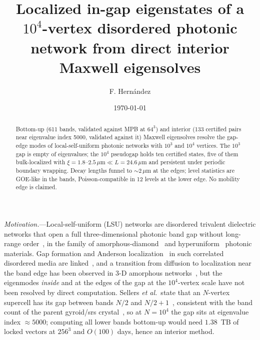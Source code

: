\documentclass[prl,twocolumn,superscriptaddress,showpacs]{revtex4-2}
\newcommand{\um}{\,\mu\mathrm{m}}
\begin{document}
\title{Localized in-gap eigenstates of a $10^4$-vertex disordered photonic network from direct interior Maxwell eigensolves}

\author{F. Hern\'andez}

\date{\today}

\begin{abstract}
Bottom-up (611 bands, validated against MPB at $64^3$) and interior (133 certified pairs near eigenvalue index 5000, validated against it) Maxwell eigensolves resolve the gap-edge modes of local-self-uniform photonic networks with $10^3$ and $10^4$ vertices. The $10^3$ gap is empty of eigenvalues; the $10^4$ pseudogap holds ten certified states, five of them bulk-localized with $\xi=1.8$--$2.5\um\ll L=24.6\um$ and persistent under periodic boundary wrapping. Decay lengths funnel to $\sim2\um$ at the edges; level statistics are GOE-like in the bands, Poisson-compatible in 12 levels at the lower edge. No mobility edge is claimed.
\end{abstract}

\maketitle

\emph{Motivation.}---Local-self-uniform (LSU) networks are disordered trivalent dielectric networks that open a full three-dimensional photonic band gap without long-range order~\cite{Sellers2017}, in the family of amorphous-diamond~\cite{Edagawa2008,Imagawa2010} and hyperuniform~\cite{Florescu2009,Man2013,Liew2011,Muller2014,Muller2017,Klatt2019} photonic materials. Gap formation and Anderson localization~\cite{Anderson1958,Abrahams1979} in such correlated disordered media are linked~\cite{John1987,FroufePerez2017}, and a transition from diffusion to localization near the band edge has been observed in 3-D amorphous networks~\cite{Haberko2020}, but the eigenmodes \emph{inside} and at the edges of the gap at the $10^4$-vertex scale have not been resolved by direct computation. Sellers \emph{et al.}\ state that an $N$-vertex supercell has its gap between bands $N/2$ and $N/2+1$~\cite{Sellers2017}, consistent with the band count of the parent gyroid/srs crystal~\cite{Lu2013}, so at $N=10^4$ the gap sits at eigenvalue index $\approx 5000$; computing all lower bands bottom-up would need $1.38$~TB of locked vectors at $256^3$ and $O(100)$ days, hence an interior method.
\end{document}
